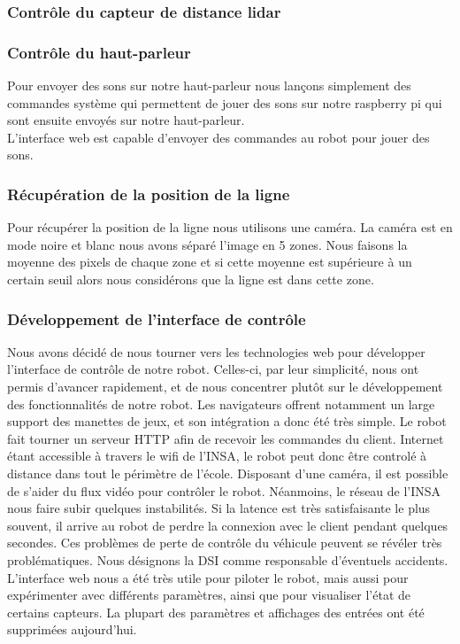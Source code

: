 \documentclass[a4paper, 12pt]{report}
\begin{document}
\subsubsection*{Contrôle du capteur de distance lidar}
\lipsum[1-2]
\subsubsection*{Contrôle du haut-parleur}
Pour envoyer des sons sur notre haut-parleur nous lançons simplement des commandes système qui permettent de jouer des sons sur notre raspberry pi qui sont ensuite envoyés sur notre haut-parleur.
\\
L'interface web est capable d'envoyer des commandes au robot pour jouer des sons.

\subsubsection*{Récupération de la position de la ligne}
Pour récupérer la position de la ligne nous utilisons une caméra. La caméra est en mode noire et blanc nous avons séparé l'image en 5 zones.
Nous faisons la moyenne des pixels de chaque zone et si cette moyenne est supérieure à un certain seuil alors nous considérons que la ligne est dans cette zone. 



\subsubsection{Développement de l'interface de contrôle}
Nous avons décidé de nous tourner vers les technologies web pour développer l'interface de contrôle de notre robot. Celles-ci, par leur simplicité, nous ont permis d'avancer rapidement, et de nous concentrer plutôt sur le développement des fonctionnalités de notre robot. Les navigateurs offrent notamment un large support des manettes de jeux, et son intégration a donc été très simple.
Le robot fait tourner un serveur HTTP afin de recevoir les commandes du client. Internet étant accessible à travers le wifi de l'INSA, le robot peut donc être controlé à distance dans tout le périmètre de l'école. Disposant d'une caméra, il est possible de s'aider du flux vidéo pour contrôler le robot.
Néanmoins, le réseau de l'INSA nous faire subir quelques instabilités. Si la latence est très satisfaisante le plus souvent, il arrive au robot de perdre la connexion avec le client pendant quelques secondes. Ces problèmes de perte de contrôle du véhicule peuvent se révéler très problématiques. Nous désignons la DSI comme responsable d'éventuels accidents.
L'interface web nous a été très utile pour piloter le robot, mais aussi pour expérimenter avec différents paramètres, ainsi que pour visualiser l'état de certains capteurs. La plupart des paramètres et affichages des entrées ont été supprimées aujourd'hui.
\end{document}
